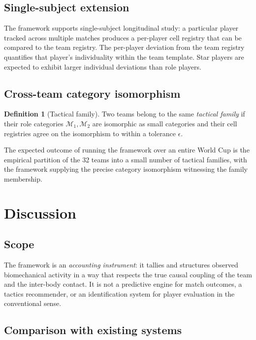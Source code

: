\documentclass[11pt,twocolumn,a4paper]{article}
\theoremstyle{definition}
\newtheorem{definition}[theorem]{Definition}
\theoremstyle{remark}
\newcommand{\Mcal}{\mathcal{M}}
\begin{document}
\subsection{Single-subject extension}

The framework supports single-subject longitudinal study: a particular
player tracked across multiple matches produces a per-player cell
registry that can be compared to the team registry. The per-player
deviation from the team registry quantifies that player's individuality
within the team template. Star players are expected to exhibit larger
individual deviations than role players.

\subsection{Cross-team category isomorphism}

\begin{definition}[Tactical family]
\label{def:family}
Two teams belong to the same \emph{tactical family} if their role
categories $\Mcal_1, \Mcal_2$ are isomorphic as small categories and
their cell registries agree on the isomorphism to within a tolerance
$\epsilon$.
\end{definition}

The expected outcome of running the framework over an entire World Cup
is the empirical partition of the 32 teams into a small number of
tactical families, with the framework supplying the precise category
isomorphism witnessing the family membership.

\section{Discussion}

\subsection{Scope}

The framework is an \emph{accounting instrument}: it tallies and
structures observed biomechanical activity in a way that respects the
true causal coupling of the team and the inter-body contact. It is not
a predictive engine for match outcomes, a tactics recommender, or an
identification system for player evaluation in the conventional sense.

\subsection{Comparison with existing systems}
\end{document}
